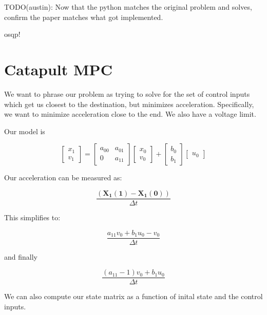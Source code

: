 \documentclass[a4paper,12pt]{article}
\begin{document}
TODO(austin): Now that the python matches the original problem and solves, confirm the paper matches what got implemented.

osqp!

\section{Catapult MPC}
We want to phrase our problem as trying to solve for the set of control inputs
which get us closest to the destination, but minimizes acceleration.
Specifically, we want to minimize acceleration close to the end.
We also have a voltage limit.

Our model is

\begin{equation}
\label{cost}
  \begin{bmatrix} x_1 \\ v_1 \end{bmatrix} =
    \begin{bmatrix} a_{00} & a_{01} \\ 0 & a_{11} \end{bmatrix}
      \begin{bmatrix} x_0 \\ v_0 \end{bmatrix} + 
    \begin{bmatrix} b_{0} \\ b_{1} \end{bmatrix} \begin{bmatrix} u_0 \end{bmatrix}
\end{equation}

Our acceleration can be measured as:

\begin{equation}
\label{accel}
  \frac{ \left( \boldsymbol{X_1(1)} - \boldsymbol{X_1(0)} \right)}{\Delta t}
\end{equation}

This simplifies to:

\begin{equation}
  \frac{a_{11} v_0 + b_1 u_0 - v_0}{\Delta t}
\end{equation}

and finally

\begin{equation}
  \frac{(a_{11} - 1) v_0 + b_1 u_0}{\Delta t}
\end{equation}


We can also compute our state matrix as a function of inital state and the control inputs.
\end{document}

